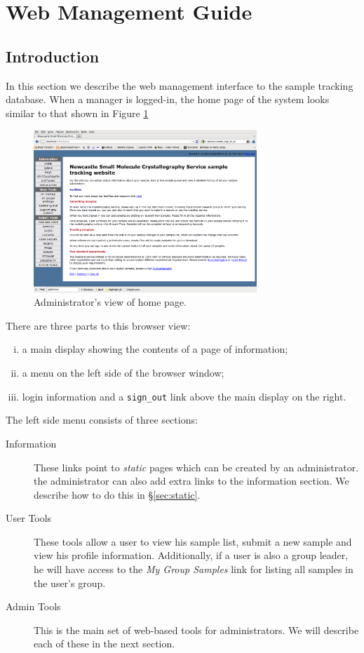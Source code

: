 \documentclass[12pt,twoside]{article}
\begin{document}
\section{Web Management Guide}
\subsection{Introduction}
In this section we describe the web management interface to the
sample tracking database. When a manager is logged-in, the home page of
the system looks similar to that shown in Figure \ref{fig:homepage}

\begin{figure}[!h]
\begin{center}
\includegraphics[width=0.75\textwidth]{homepage}
\caption{Administrator's view of home page.\label{fig:homepage}}
\end{center}
\end{figure}

There are three parts to this browser view:
\begin{enumerate}[(i)]
\item
a main display showing the contents of a page of information;
\item
a menu on the left side of the browser window;
\item
login information and a \verb=sign_out= link above the main display on
the right.
\end{enumerate}

The left side menu consists of three sections:
\begin{description}
\item[Information]
These links point to \emph{static} pages which can be created by an
administrator. the administrator can also add extra links to the
information section. We describe how to do this in \S\ref{sec:static}.
\item[User Tools]
These tools allow a user to view his sample list, submit a new sample
and view his profile information. Additionally, if a user is also a group
leader, he will have access to the \emph{My Group Samples} link for listing
all samples in the user's group.
\item[Admin Tools]
This is the main set of web-based tools for administrators. We will
describe each of these in the next section.
\end{description}
\end{document}

